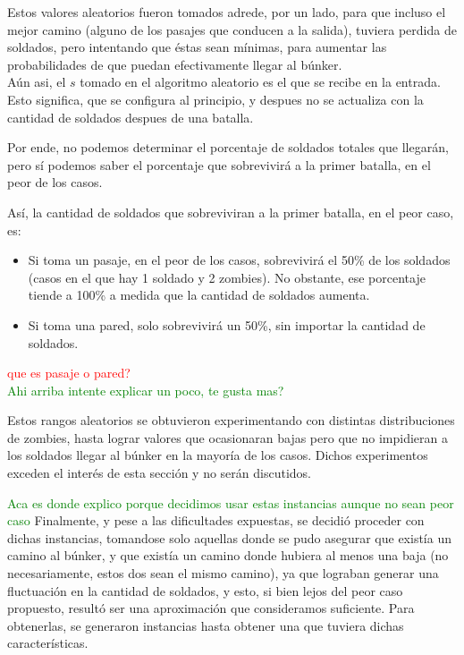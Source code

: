 Estos valores aleatorios fueron tomados adrede, por un lado, para que incluso el mejor camino (alguno de los pasajes que conducen a la salida), tuviera perdida de soldados, pero intentando que éstas sean mínimas, para aumentar las probabilidades de que puedan efectivamente llegar al búnker.\\

Aún asi, el $s$ tomado en el algoritmo aleatorio es el que se recibe en la entrada. Esto significa, que se configura al principio, y despues no se actualiza con la cantidad de soldados despues de una batalla.

Por ende, no podemos determinar el porcentaje de soldados totales que llegarán, pero sí podemos saber el porcentaje que sobrevivirá a la primer batalla, en el peor de los casos.

Así, la cantidad de soldados que sobreviviran a la primer batalla, en el peor caso, es:
\begin{itemize}
	\item Si toma un pasaje, en el peor de los casos, sobrevivirá el 50\% de los soldados (casos en el que hay 1 soldado y 2 zombies). No obstante, ese porcentaje tiende a 100\% a medida que la cantidad de soldados aumenta.
	\item Si toma una pared, solo sobrevivirá un 50\%, sin importar la cantidad de soldados.
\end{itemize}
\textcolor{red}{que es pasaje o pared?}\\
\textcolor{green}{Ahi arriba intente explicar un poco, te gusta mas?}

Estos rangos aleatorios se obtuvieron experimentando con distintas distribuciones de zombies, hasta lograr valores que ocasionaran bajas pero que no impidieran a los soldados llegar al búnker en la mayoría de los casos. Dichos experimentos exceden el interés de esta sección y no serán discutidos.\\

\bigskip

\textcolor{green}{Aca es donde explico porque decidimos usar estas instancias aunque no sean peor caso}
Finalmente, y pese a las dificultades expuestas, se decidió proceder con dichas instancias, tomandose solo aquellas donde se pudo asegurar que existía un camino al búnker, y que existía un camino donde hubiera al menos una baja (no necesariamente, estos dos sean el mismo camino), ya que lograban generar una fluctuación en la cantidad de soldados, y esto, si bien lejos del peor caso propuesto, resultó ser una aproximación que consideramos suficiente.
Para obtenerlas, se generaron instancias hasta obtener una que tuviera dichas características.\\

